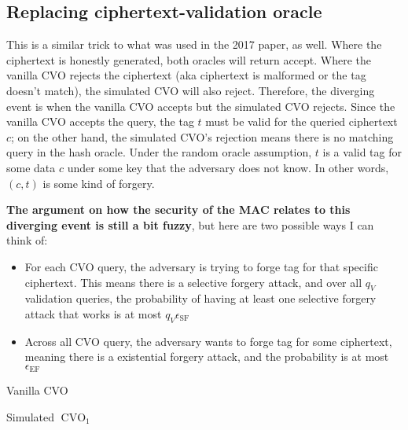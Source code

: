 \documentclass{article}
\begin{document}
\subsection{Replacing ciphertext-validation oracle}\label{replacing-cvo}
This is a similar trick to what was used in the 2017 paper, as well. Where the ciphertext is honestly generated, both oracles will return accept. Where the vanilla CVO rejects the ciphertext (aka ciphertext is malformed or the tag doesn't match), the simulated CVO will also reject. Therefore, the diverging event is when the vanilla CVO accepts but the simulated CVO rejects. Since the vanilla CVO accepts the query, the tag $t$ must be valid for the queried ciphertext $c$; on the other hand, the simulated CVO's rejection means there is no matching query in the hash oracle. Under the random oracle assumption, $t$ is a valid tag for some data $c$ under some key that the adversary does not know. In other words, $(c, t)$ is some kind of forgery.

\textbf{The argument on how the security of the MAC relates to this diverging event is still a bit fuzzy}, but here are two possible ways I can think of:

\begin{itemize}
    \item For each CVO query, the adversary is trying to forge tag for that specific ciphertext. This means there is a selective forgery attack, and over all $q_V$ validation queries, the probability of having at least one selective forgery attack that works is at most $q_V\epsilon_\text{SF}$
    
    \item Across all CVO query, the adversary wants to forge tag for some ciphertext, meaning there is a existential forgery attack, and the probability is at most $\epsilon_\text{EF}$
\end{itemize}

\begin{multicols}{2}
    \begin{algorithm}[H]
        \SetAlgoLined
        \caption{Vanilla CVO}
    \end{algorithm}

    \columnbreak

    \begin{algorithm}[H]
        \SetAlgoLined
        \caption{Simulated $\operatorname{CVO}_1$}
        \Return{$\bot$}
    \end{algorithm}
\end{multicols}
\end{document}
